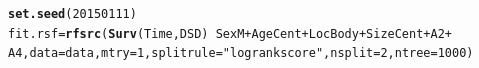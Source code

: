\documentclass{article}\usepackage[]{graphicx}\usepackage[]{color}
\makeatletter
\newcommand{\hlnum}[1]{\textcolor[rgb]{0.686,0.059,0.569}{#1}}%
\newcommand{\hlstr}[1]{\textcolor[rgb]{0.192,0.494,0.8}{#1}}%
\newcommand{\hlopt}[1]{\textcolor[rgb]{0,0,0}{#1}}%
\newcommand{\hlstd}[1]{\textcolor[rgb]{0.345,0.345,0.345}{#1}}%
\newcommand{\hlkwb}[1]{\textcolor[rgb]{0.69,0.353,0.396}{#1}}%
\newcommand{\hlkwc}[1]{\textcolor[rgb]{0.333,0.667,0.333}{#1}}%
\newcommand{\hlkwd}[1]{\textcolor[rgb]{0.737,0.353,0.396}{\textbf{#1}}}%
\newenvironment{kframe}{%
 \def\at@end@of@kframe{}%
 \ifinner\ifhmode%
  \def\at@end@of@kframe{\end{minipage}}%
  \begin{minipage}{\columnwidth}%
 \fi\fi%
 \def\FrameCommand##1{\hskip\@totalleftmargin \hskip-\fboxsep
 \colorbox{shadecolor}{##1}\hskip-\fboxsep
     \hskip-\linewidth \hskip-\@totalleftmargin \hskip\columnwidth}%
 \MakeFramed {\advance\hsize-\width
   \@totalleftmargin\z@ \linewidth\hsize
   \@setminipage}}%
 {\par\unskip\endMakeFramed%
 \at@end@of@kframe}
\newenvironment{knitrout}{}{} %
\makeatother
\begin{document}
\begin{knitrout}
\color{fgcolor}\begin{kframe}
\begin{alltt}
\hlkwd{set.seed}\hlstd{(}\hlnum{20150111}\hlstd{)}
\hlstd{fit.rsf} \hlkwb{=} \hlkwd{rfsrc}\hlstd{(}\hlkwd{Surv}\hlstd{(Time, DSD)} \hlopt{~} \hlstd{SexM} \hlopt{+} \hlstd{AgeCent} \hlopt{+} \hlstd{LocBody} \hlopt{+} \hlstd{SizeCent} \hlopt{+} \hlstd{A2} \hlopt{+}
    \hlstd{A4,} \hlkwc{data} \hlstd{= data,} \hlkwc{mtry} \hlstd{=} \hlnum{1}\hlstd{,} \hlkwc{splitrule} \hlstd{=} \hlstr{"logrankscore"}\hlstd{,} \hlkwc{nsplit} \hlstd{=} \hlnum{2}\hlstd{,} \hlkwc{ntree} \hlstd{=} \hlnum{1000}\hlstd{)}
\end{alltt}
\end{kframe}
\end{knitrout}
\end{document}
